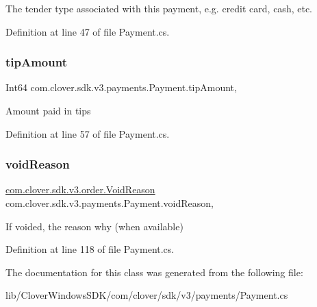 The tender type associated with this payment, e.\+g. credit card, cash, etc. 



Definition at line 47 of file Payment.\+cs.

\mbox{\label{classcom_1_1clover_1_1sdk_1_1v3_1_1payments_1_1_payment_acc7b1bbf6cc2e5132c1c9c08a6af3c23}} 
\subsubsection{\texorpdfstring{tip\+Amount}{tipAmount}}
{\footnotesize\ttfamily Int64 com.\+clover.\+sdk.\+v3.\+payments.\+Payment.\+tip\+Amount\hspace{0.3cm}{\ttfamily [get]}, {\ttfamily [set]}}



Amount paid in tips 



Definition at line 57 of file Payment.\+cs.

\mbox{\label{classcom_1_1clover_1_1sdk_1_1v3_1_1payments_1_1_payment_a037af65f45c8fd866641b93efb74cfb5}} 
\subsubsection{\texorpdfstring{void\+Reason}{voidReason}}
{\footnotesize\ttfamily \hyperlink{namespacecom_1_1clover_1_1sdk_1_1v3_1_1order_acb5aac0c1f6aeeb5b636223a69d2dec2}{com.\+clover.\+sdk.\+v3.\+order.\+Void\+Reason} com.\+clover.\+sdk.\+v3.\+payments.\+Payment.\+void\+Reason\hspace{0.3cm}{\ttfamily [get]}, {\ttfamily [set]}}



If voided, the reason why (when available) 



Definition at line 118 of file Payment.\+cs.



The documentation for this class was generated from the following file\+:\begin{DoxyCompactItemize}
\item 
lib/\+Clover\+Windows\+S\+D\+K/com/clover/sdk/v3/payments/Payment.\+cs\end{DoxyCompactItemize}

